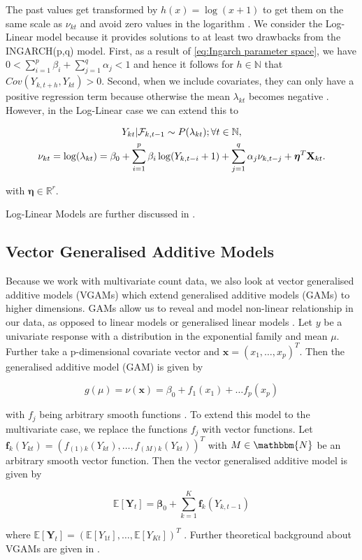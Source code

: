 The past values get transformed by $h(x)=\log(x+1)$ to get them on the same scale as $\nu_{kt}$ and avoid zero values in the logarithm \cite{Liboschik:2016,Fokianos:2011}. We consider the Log-Linear model because it provides solutions to at least two drawbacks from the INGARCH(p,q) model. First, as a result of \ref{eq:Ingarch parameter space}, we have $0 < \sum_{i=1}^p\beta_i + \sum_{j=1}^q\alpha_j < 1$ and hence it follows for $h\in \mathbb{N}$ that $Cov(Y_{k,t+h},Y_{kt})>0$. Second, when we include covariates, they can only have a positive regression term because otherwise the mean $\lambda_{kt}$ becomes negative \cite{Fokianos:2011}. However, in the Log-Linear case we can extend this to

\begin{gather}
Y_{kt} | \mathcal{F}_{k,t-1} \sim P(\lambda_{kt}); \forall t \in \mathbb{N}, \\
\nu_{kt}= \log(\lambda_{kt}) = \beta_0 + \sum_{i=1}^p\beta_i \log(Y_{k,t-i}+1) + \sum_{j=1}^q\alpha_j \nu_{k,t-j} + \bm{\eta}^T\textbf{X}_{kt}.
\label{eq:Log-Linear model external factors}
\end{gather}

with $\bm{\eta} \in \mathbb{R}^r$. 

Log-Linear Models are further discussed in \cite{Fokianos:2011,Woodard:2011,Douc:2013}.


\subsection{Vector Generalised Additive Models}
\label{sec:Vgam}

Because we work with multivariate count data, we also look at vector generalised additive models (VGAMs) which extend generalised additive models (GAMs) to higher dimensions. GAMs allow us to reveal and model non-linear relationship in our data, as opposed to linear models or generalised linear models \cite{Yee:1996}. Let $y$ be a univariate response with a distribution in the exponential family and mean $\mu$. Further take a p-dimensional covariate vector and $\bm{x}=(x_1,\ldots,x_p)^T$. Then the generalised additive model (GAM) is given by

\begin{equation}
g(\mu) = \nu(\bm{x}) = \beta_0 + f_1(x_1) + \ldots f_p(x_p)
\label{eq:Gam}
\end{equation}

with $f_j$ being arbitrary smooth functions \cite{Yee:1996}.
To extend this model to the multivariate case, we replace the functions $f_j$ with vector functions. Let $\bm{f}_k(Y_{kt}) = (f_{(1)k}(Y_{kt}),\ldots,f_{(M)k}(Y_{kt}))^T$ with $M \in \mathbbm{N}$ be an arbitrary smooth vector function. Then the vector generalised additive model is given by

\begin{equation}
\mathbb{E}[\bm{Y}_t] = \bm{\beta}_0 + \sum_{k=1}^K\bm{f}_k(Y_{k,t-1})
\label{eq:Vgam}
\end{equation}

where $\mathbb{E}[\bm{Y}_t] = (\mathbb{E}[Y_{1t}],\ldots,\mathbb{E}[Y_{Kt}])^T$ \cite{Yee:1996}. Further theoretical background about VGAMs are given in \cite{Yee:1996,Yee:2015,Wood:2004}.
